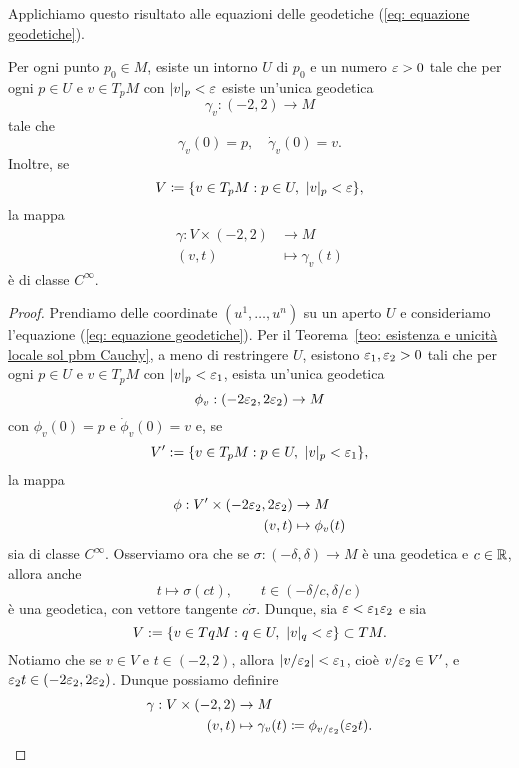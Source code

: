 	
	Applichiamo questo risultato alle equazioni delle geodetiche (\ref{eq: equazione geodetiche}).
	\begin{teo}\label{teo: esistenza mappa exp}
		Per ogni punto \(p_0 \in M\), esiste un intorno \(U\) di \(p_0\) e un numero \(\varepsilon>0\) tale che per ogni \(p \in U\) e \(v \in T_pM\) con \(|v|_p < \varepsilon\) esiste un'unica geodetica
		\[
		\gamma_v: (-2,2) \to M
		\]
		tale che
		\[
		\gamma_v(0)=p, \quad \dot \gamma_v(0) = v.
		\]
		Inoltre, se 
		\[
		V \coloneq \{v \in T_pM : p \in U, \ |v|_p < \varepsilon\},
		\]
		la mappa 
		\begin{align*}
			\gamma: V \times (-2,2) &\to M \\
			(v,t) &\mapsto \gamma_v(t)
		\end{align*}
		è di classe \(C^\infty\). 
	\end{teo}
	\begin{proof}
		Prendiamo delle coordinate \((u^1,\dots,u^n)\) su un aperto \(U\) e consideriamo l'equazione (\ref{eq: equazione geodetiche}). Per il Teorema~\ref{teo: esistenza e unicità locale sol pbm Cauchy}, a meno di restringere \(U\), esistono \(\varepsilon_1,\varepsilon_2>0\) tali che per ogni \(p \in U\) e \(v \in T_pM\) con \(|v|_p < \varepsilon_1\), esista un'unica geodetica 
		\[
		\phi_v:(-2\varepsilon_2,2\varepsilon_2) \to M
		\]
		con \(\phi_v(0)=p\) e \(\dot \phi_v(0)=v\) e, se 
		\[
		V':=\{v \in T_pM : p \in U, \ |v|_p < \varepsilon_1\},
		\]
		la mappa
		\begin{align*}
			\phi:V' \times(-2\varepsilon_2,2\varepsilon_2) &\to M \\
			(v,t) &\mapsto \phi_v(t)
		\end{align*}
		sia di classe \(C^\infty\). Osserviamo ora che se \(\sigma:(-\delta,\delta) \to M\) è una geodetica e \(c \in \mathbb{R}\), allora anche
		\begin{equation*}
			t \mapsto \sigma(ct), \qquad t \in (-\delta/c,\delta/c)
		\end{equation*}
		è una geodetica, con vettore tangente \(c\dot{\sigma}\).
		Dunque, sia \(\varepsilon < \varepsilon_1 \varepsilon_2\) e sia 
		\[
		V:=\{v \in TqM : q \in U, \ |v|_q < \varepsilon\} \subset TM.
		\]
		Notiamo che se \(v \in V\) e \(t \in (-2,2)\), allora \(|v/\varepsilon_2|<\varepsilon_1\), cioè \(v/\varepsilon_2 \in V'\), e \(\varepsilon_2 t \in (-2\varepsilon_2,2\varepsilon_2)\). Dunque possiamo definire
		\begin{align*}
			\gamma: V \times (-2,2) &\to M \\
			(v,t) &\mapsto \gamma_v(t) \coloneq \phi_{v/\varepsilon_2}(\varepsilon_2 t).
		\end{align*}
	\end{proof}
	
